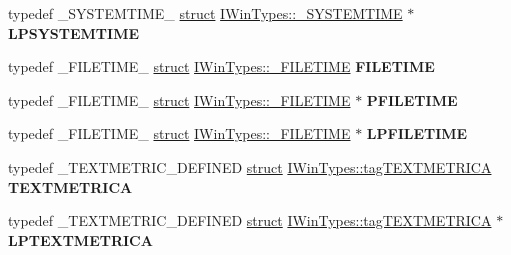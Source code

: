 \begin{DoxyCompactItemize}
\item 
\mbox{\label{interface_i_win_types_a79712c98af51067a403be94ce1781c94}} 
typedef \+\_\+\+S\+Y\+S\+T\+E\+M\+T\+I\+M\+E\+\_\+ \hyperlink{interfacestruct}{struct} \hyperlink{struct_i_win_types_1_1___s_y_s_t_e_m_t_i_m_e}{I\+Win\+Types\+::\+\_\+\+S\+Y\+S\+T\+E\+M\+T\+I\+ME} $\ast$ {\bfseries L\+P\+S\+Y\+S\+T\+E\+M\+T\+I\+ME}
\item 
\mbox{\label{interface_i_win_types_a471f7d8e992eb95518aaee1f19a161ef}} 
typedef \+\_\+\+F\+I\+L\+E\+T\+I\+M\+E\+\_\+ \hyperlink{interfacestruct}{struct} \hyperlink{struct_i_win_types_1_1___f_i_l_e_t_i_m_e}{I\+Win\+Types\+::\+\_\+\+F\+I\+L\+E\+T\+I\+ME} {\bfseries F\+I\+L\+E\+T\+I\+ME}
\item 
\mbox{\label{interface_i_win_types_a3498f44a7ce615fc21b02fe1648211bc}} 
typedef \+\_\+\+F\+I\+L\+E\+T\+I\+M\+E\+\_\+ \hyperlink{interfacestruct}{struct} \hyperlink{struct_i_win_types_1_1___f_i_l_e_t_i_m_e}{I\+Win\+Types\+::\+\_\+\+F\+I\+L\+E\+T\+I\+ME} $\ast$ {\bfseries P\+F\+I\+L\+E\+T\+I\+ME}
\item 
\mbox{\label{interface_i_win_types_a34059dd229314cf4877020d32c038df0}} 
typedef \+\_\+\+F\+I\+L\+E\+T\+I\+M\+E\+\_\+ \hyperlink{interfacestruct}{struct} \hyperlink{struct_i_win_types_1_1___f_i_l_e_t_i_m_e}{I\+Win\+Types\+::\+\_\+\+F\+I\+L\+E\+T\+I\+ME} $\ast$ {\bfseries L\+P\+F\+I\+L\+E\+T\+I\+ME}
\item 
\mbox{\label{interface_i_win_types_ab300dc70dad10677ef6fb08fb4b30044}} 
typedef \+\_\+\+T\+E\+X\+T\+M\+E\+T\+R\+I\+C\+\_\+\+D\+E\+F\+I\+N\+ED \hyperlink{interfacestruct}{struct} \hyperlink{struct_i_win_types_1_1tag_t_e_x_t_m_e_t_r_i_c_a}{I\+Win\+Types\+::tag\+T\+E\+X\+T\+M\+E\+T\+R\+I\+CA} {\bfseries T\+E\+X\+T\+M\+E\+T\+R\+I\+CA}
\item 
\mbox{\label{interface_i_win_types_a0f300833483fd36fbc5953f05e4a2604}} 
typedef \+\_\+\+T\+E\+X\+T\+M\+E\+T\+R\+I\+C\+\_\+\+D\+E\+F\+I\+N\+ED \hyperlink{interfacestruct}{struct} \hyperlink{struct_i_win_types_1_1tag_t_e_x_t_m_e_t_r_i_c_a}{I\+Win\+Types\+::tag\+T\+E\+X\+T\+M\+E\+T\+R\+I\+CA} $\ast$ {\bfseries L\+P\+T\+E\+X\+T\+M\+E\+T\+R\+I\+CA}
\item 

\end{DoxyCompactItemize}
